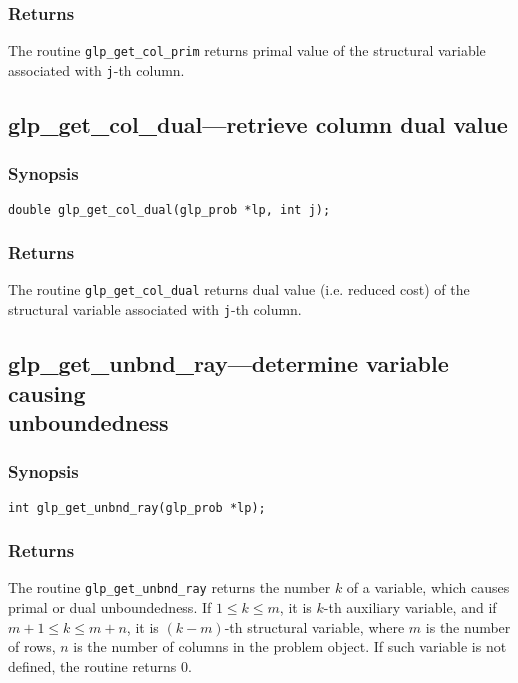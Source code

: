 \subsubsection*{Returns}

The routine \verb|glp_get_col_prim| returns primal value of the
structural variable associated with \verb|j|-th column.

\subsection{glp\_get\_col\_dual---retrieve column dual value}

\subsubsection*{Synopsis}

\begin{verbatim}
double glp_get_col_dual(glp_prob *lp, int j);
\end{verbatim}

\subsubsection*{Returns}

The routine \verb|glp_get_col_dual| returns dual value (i.e. reduced
cost) of the structural variable associated with \verb|j|-th column.

\newpage

\subsection{glp\_get\_unbnd\_ray---determine variable causing\\
unboundedness}

\subsubsection*{Synopsis}

\begin{verbatim}
int glp_get_unbnd_ray(glp_prob *lp);
\end{verbatim}

\subsubsection*{Returns}

The routine \verb|glp_get_unbnd_ray| returns the number $k$ of
a variable, which causes primal or dual unboundedness.
If $1\leq k\leq m$, it is $k$-th auxiliary variable, and if
$m+1\leq k\leq m+n$, it is $(k-m)$-th structural variable, where $m$ is
the number of rows, $n$ is the number of columns in the problem object.
If such variable is not defined, the routine returns 0.

